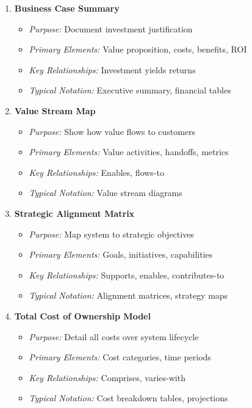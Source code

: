\documentclass[11pt,letterpaper]{article}
\begin{document}
\begin{enumerate}[label=\textbf{MT\arabic*:}, leftmargin=2.5em]
    \item \textbf{Business Case Summary}
    \begin{itemize}[nosep]
        \item \textit{Purpose:} Document investment justification
        \item \textit{Primary Elements:} Value proposition, costs, benefits, ROI
        \item \textit{Key Relationships:} Investment yields returns
        \item \textit{Typical Notation:} Executive summary, financial tables
    \end{itemize}
    
    \item \textbf{Value Stream Map}
    \begin{itemize}[nosep]
        \item \textit{Purpose:} Show how value flows to customers
        \item \textit{Primary Elements:} Value activities, handoffs, metrics
        \item \textit{Key Relationships:} Enables, flows-to
        \item \textit{Typical Notation:} Value stream diagrams
    \end{itemize}
    
    \item \textbf{Strategic Alignment Matrix}
    \begin{itemize}[nosep]
        \item \textit{Purpose:} Map system to strategic objectives
        \item \textit{Primary Elements:} Goals, initiatives, capabilities
        \item \textit{Key Relationships:} Supports, enables, contributes-to
        \item \textit{Typical Notation:} Alignment matrices, strategy maps
    \end{itemize}
    
    \item \textbf{Total Cost of Ownership Model}
    \begin{itemize}[nosep]
        \item \textit{Purpose:} Detail all costs over system lifecycle
        \item \textit{Primary Elements:} Cost categories, time periods
        \item \textit{Key Relationships:} Comprises, varies-with
        \item \textit{Typical Notation:} Cost breakdown tables, projections
    \end{itemize}
    

\end{enumerate}
\end{document}
